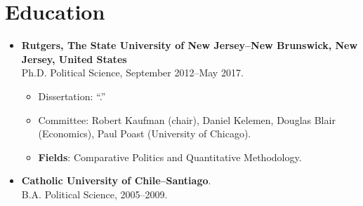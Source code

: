 \section*{Education}

\begin{itemize}
  \item {\bf Rutgers, The State University of New Jersey--New Brunswick, New Jersey, United States}\\
  Ph.D. Political Science, September 2012--May 2017.
    	\begin{itemize}
      		\item[] Dissertation: ``{\unskip}.''
      		\item[] Committee: Robert Kaufman (chair), Daniel Kelemen, Douglas Blair (Economics), Paul Poast (University of Chicago).
          \item[] {\bf Fields}: Comparative Politics and Quantitative Methodology.
		  \end{itemize}

\item {\bf Catholic University of Chile--Santiago}.\\
B.A. Political Science, 2005--2009.
\end{itemize}
